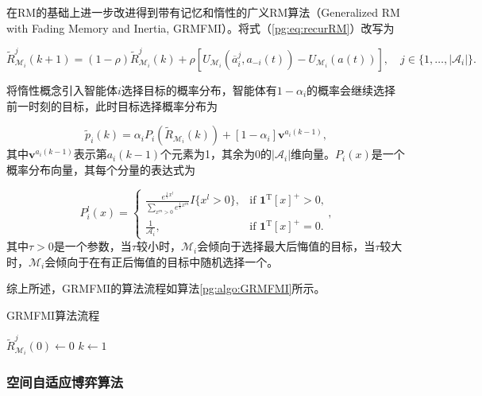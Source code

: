 在RM的基础上进一步改进得到带有记忆和惰性的广义RM算法（Generalized RM with Fading Memory and Inertia, GRMFMI）。将式（\ref{pg:eq:recurRM}）改写为

\begin{equation}
	\widetilde R_{\mathcal{M}_i}^j(k+1) = (1-\rho)\widetilde R_{\mathcal{M}_i}^j(k) + \rho [U_{\mathcal{M}_i}(\overline a_i^j, a_{-i}(t)) - U_{\mathcal{M}_i}(a(t))],\quad j \in \{1,\dots,|\mathcal{A}_i|\}.
\end{equation}

将惰性概念引入智能体$i$选择目标的概率分布，智能体有$1-\alpha_i$的概率会继续选择前一时刻的目标，此时目标选择概率分布为

\begin{equation}
\label{pg:eq:interiapdf}
	\widetilde p_i(k) = \alpha_i P_i(\widetilde R_{\mathcal{M}_i}(k)) + [1-\alpha _i]{\bm v}^{a_i(k-1)},
\end{equation}
其中${\bm v}^{a_i(k-1)}$表示第$a_i(k-1)$个元素为1，其余为0的$|\mathcal{A}_i|$维向量。$P_i(x)$是一个概率分布向量，其每个分量的表达式为

\begin{equation}
	P_i^l(x) = 	
	\begin{cases}
		\frac{e^{\frac{1}{\tau} x^l}}{\sum_{x^m>0}e^{\frac{1}{\tau}x^m}} I\{x^l>0\}, & \text{if ${\bm 1}^{\mathrm T}[x]^+>0$,}\\
		\frac{1}{\mathcal{A}_i}, & \text{if ${\bm{1}}^{\mathrm T}[x]^+=0$.}
	\end{cases},
\end{equation}
其中$\tau>0$是一个参数，当$\tau$较小时，$\mathcal{M}_i$会倾向于选择最大后悔值的目标，当$\tau$较大时，$\mathcal{M}_i$会倾向于在有正后悔值的目标中随机选择一个。

综上所述，GRMFMI的算法流程如算法\ref{pg:algo:GRMFMI}所示。

\begin{algorithm}[htb]
	\caption{GRMFMI算法流程}
	\label{pg:algo:GRMFMI}
	\small
	\SetAlgoLined
	$\widetilde R_{\mathcal{M}_i}^j(0) \gets 0$\;
	$k \gets 1$\;
\end{algorithm}


\subsubsection{空间自适应博弈算法}
\label{pgta:protocal:sap}

